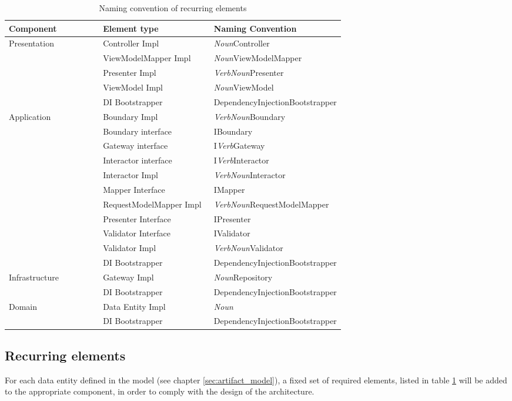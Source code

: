     \begin{table}[h]
        \small
        \begin{tabular}{ l p{0.33\linewidth} p{0.39\linewidth} }
        \hline
        \textbf{Component} & \textbf{Element type} & \textbf{Naming Convention} \\ 
        \hline
        Presentation & Controller Impl & \textit{Noun}Controller \\ \hline
        & ViewModelMapper Impl & \textit{Noun}ViewModelMapper \\ \hline
        & Presenter Impl & \textit{VerbNoun}Presenter \\ \hline
        & ViewModel Impl & \textit{Noun}ViewModel \\ \hline
        & DI Bootstrapper & DependencyInjectionBootstrapper \\ \hline

        Application & Boundary Impl & \textit{VerbNoun}Boundary \\ \hline
        & Boundary interface & IBoundary \\ \hline
        & Gateway interface & I\textit{Verb}Gateway \\ \hline
        & Interactor interface & I\textit{Verb}Interactor \\ \hline
        & Interactor Impl & \textit{VerbNoun}Interactor \\ \hline
        & Mapper Interface & IMapper \\ \hline
        & RequestModelMapper Impl & \textit{VerbNoun}RequestModelMapper \\ \hline
        & Presenter Interface & IPresenter \\ \hline
        & Validator Interface & IValidator \\ \hline
        & Validator Impl & \textit{VerbNoun}Validator \\ \hline
        & DI Bootstrapper & DependencyInjectionBootstrapper \\ \hline
        
        Infrastructure & Gateway Impl & \textit{Noun}Repository \\ \hline
        & DI Bootstrapper & DependencyInjectionBootstrapper \\ \hline

        Domain & Data Entity Impl & \textit{Noun} \\ \hline
        & DI Bootstrapper & DependencyInjectionBootstrapper \\ \hline
        \end{tabular}
        \caption{Naming convention of recurring elements}
        \label{table:element_naming_convention}
        \end{table}

    \subsection{Recurring elements}
    
    For each data entity defined in the model (see chapter \ref{sec:artifact_model}), a
    fixed set of required elements, listed in table \ref{table:element_naming_convention}
    will be added to the appropriate component, in order to comply with the design of the
    architecture.